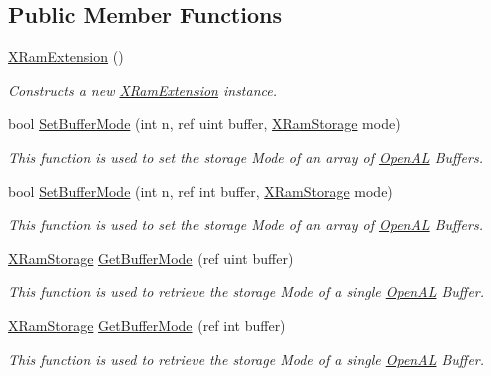 \subsection*{Public Member Functions}
\begin{DoxyCompactItemize}
\item 
\hyperlink{class_open_t_k_1_1_audio_1_1_open_a_l_1_1_x_ram_extension_a5bbdd3c65e96f12dbc05c41258505438}{X\-Ram\-Extension} ()
\begin{DoxyCompactList}\small\item\em Constructs a new \hyperlink{class_open_t_k_1_1_audio_1_1_open_a_l_1_1_x_ram_extension}{X\-Ram\-Extension} instance. \end{DoxyCompactList}\item 
bool \hyperlink{class_open_t_k_1_1_audio_1_1_open_a_l_1_1_x_ram_extension_afb7db35bd51bbeaa515ca62246a69feb}{Set\-Buffer\-Mode} (int n, ref uint buffer, \hyperlink{class_open_t_k_1_1_audio_1_1_open_a_l_1_1_x_ram_extension_a3803535777a75c990d24d61ac1acfd3f}{X\-Ram\-Storage} mode)
\begin{DoxyCompactList}\small\item\em This function is used to set the storage Mode of an array of \hyperlink{namespace_open_t_k_1_1_audio_1_1_open_a_l}{Open\-A\-L} Buffers.\end{DoxyCompactList}\item 
bool \hyperlink{class_open_t_k_1_1_audio_1_1_open_a_l_1_1_x_ram_extension_a07697ac8d3690dc730dc6d104e3487cb}{Set\-Buffer\-Mode} (int n, ref int buffer, \hyperlink{class_open_t_k_1_1_audio_1_1_open_a_l_1_1_x_ram_extension_a3803535777a75c990d24d61ac1acfd3f}{X\-Ram\-Storage} mode)
\begin{DoxyCompactList}\small\item\em This function is used to set the storage Mode of an array of \hyperlink{namespace_open_t_k_1_1_audio_1_1_open_a_l}{Open\-A\-L} Buffers.\end{DoxyCompactList}\item 
\hyperlink{class_open_t_k_1_1_audio_1_1_open_a_l_1_1_x_ram_extension_a3803535777a75c990d24d61ac1acfd3f}{X\-Ram\-Storage} \hyperlink{class_open_t_k_1_1_audio_1_1_open_a_l_1_1_x_ram_extension_a01383d8e9a8622ce4db20d70cb345847}{Get\-Buffer\-Mode} (ref uint buffer)
\begin{DoxyCompactList}\small\item\em This function is used to retrieve the storage Mode of a single \hyperlink{namespace_open_t_k_1_1_audio_1_1_open_a_l}{Open\-A\-L} Buffer.\end{DoxyCompactList}\item 
\hyperlink{class_open_t_k_1_1_audio_1_1_open_a_l_1_1_x_ram_extension_a3803535777a75c990d24d61ac1acfd3f}{X\-Ram\-Storage} \hyperlink{class_open_t_k_1_1_audio_1_1_open_a_l_1_1_x_ram_extension_abfcce8897017cfeda943cfb1bcbc27e4}{Get\-Buffer\-Mode} (ref int buffer)
\begin{DoxyCompactList}\small\item\em This function is used to retrieve the storage Mode of a single \hyperlink{namespace_open_t_k_1_1_audio_1_1_open_a_l}{Open\-A\-L} Buffer.\end{DoxyCompactList}\end{DoxyCompactItemize}
